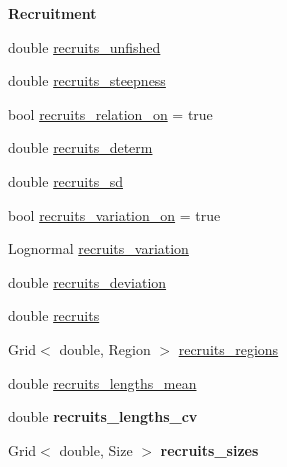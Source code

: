 \begin{Indent}{\bf Recruitment}\par
\begin{DoxyCompactItemize}
\item 
double \hyperlink{classIOSKJ_1_1Model_a780f4e69674141e96e028765004608ea}{recruits\-\_\-unfished}
\item 
double \hyperlink{classIOSKJ_1_1Model_ae3660f3f79edc131d7b96cf391f6a902}{recruits\-\_\-steepness}
\item 
bool \hyperlink{classIOSKJ_1_1Model_a88f9a0d53e76f9a88bf0d81c30bdb612}{recruits\-\_\-relation\-\_\-on} = true
\item 
double \hyperlink{classIOSKJ_1_1Model_ad2450f5604c657cbe259b7b49e8f905a}{recruits\-\_\-determ}
\item 
double \hyperlink{classIOSKJ_1_1Model_aff3f79494f94a20043a0c57009129dea}{recruits\-\_\-sd}
\item 
bool \hyperlink{classIOSKJ_1_1Model_a164e3c054caea071da7079d5ff27833b}{recruits\-\_\-variation\-\_\-on} = true
\item 
Lognormal \hyperlink{classIOSKJ_1_1Model_ad9518caa30a28b5ae7afa7677e33bca2}{recruits\-\_\-variation}
\item 
double \hyperlink{classIOSKJ_1_1Model_a639afa6cd0480ad8c6dbac286bdaa55c}{recruits\-\_\-deviation}
\item 
double \hyperlink{classIOSKJ_1_1Model_a8ffa15a7aea7598d5a6c91bec5779ef3}{recruits}
\item 
Grid$<$ double, Region $>$ \hyperlink{classIOSKJ_1_1Model_a72f5daedbc9eeb857e665e4e371783d6}{recruits\-\_\-regions}
\item 
double \hyperlink{classIOSKJ_1_1Model_a6bb5b6a203c92c799dd2c34cf0fe1423}{recruits\-\_\-lengths\-\_\-mean}
\item 
\hypertarget{classIOSKJ_1_1Model_a743b6f4caa8e33db6795fec03f3fa634}{double {\bfseries recruits\-\_\-lengths\-\_\-cv}}\label{classIOSKJ_1_1Model_a743b6f4caa8e33db6795fec03f3fa634}

\item 
\hypertarget{classIOSKJ_1_1Model_a0f3abbd618991a9aad0b159a951a943c}{Grid$<$ double, Size $>$ {\bfseries recruits\-\_\-sizes}}\label{classIOSKJ_1_1Model_a0f3abbd618991a9aad0b159a951a943c}

\end{DoxyCompactItemize}
\end{Indent}
